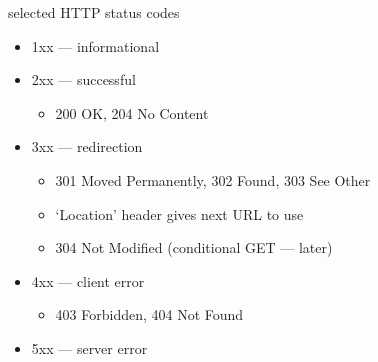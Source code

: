 \begin{frame}{selected HTTP status codes}
\begin{itemize}
\item 1xx --- informational
\item 2xx --- successful
    \begin{itemize}
    \item 200 OK, 204 No Content
    \end{itemize}
\item 3xx --- redirection
    \begin{itemize}
    \item 301 Moved Permanently, 302 Found, 303 See Other
    \item `Location' header gives next URL to use
    \item 304 Not Modified (conditional GET --- later)
    \end{itemize}
\item 4xx --- client error
    \begin{itemize}
    \item 403 Forbidden, 404 Not Found
    \end{itemize}
\item 5xx --- server error
\end{itemize}
\end{frame}
